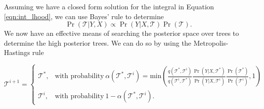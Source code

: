 Assuming we have a closed form solution for the integral in Equation \ref{eqn:int_lhood}, we can use Bayes' rule to determine 
\begin{equation}\label{eqn:tree_post}
\Pr(\mathcal{T} \vert Y , X) \propto \Pr(Y \vert X ,\mathcal{T})\Pr(\mathcal{T}).
\end{equation} 
We now have an effective means of searching the posterior space over trees to determine the high posterior trees. We can do so by using the Metropolis-Hastings rule 

\begin{equation}\label{eqn:MHrule}
\mathcal{T}^{i+1} =\begin{cases}
\mathcal{T}^*, & \text{with probability}\ \alpha(\mathcal{T}^*, \mathcal{T}^i) = \text{min}\left(\frac{q(\mathcal{T}^*, \mathcal{T}^i)}{q(\mathcal{T}^i, \mathcal{T}^*)}\frac{\Pr(Y\vert X, \mathcal{T}^*)}{\Pr(Y\vert X,\mathcal{T}^i)}\frac{\Pr(\mathcal{T}^{*})}{\Pr(\mathcal{T}^i)},1 \right) \\
\mathcal{T}^{i}, & \text{with probability}\ 1-\alpha(\mathcal{T}^*, \mathcal{T}^i).
\end{cases} \end{equation}

